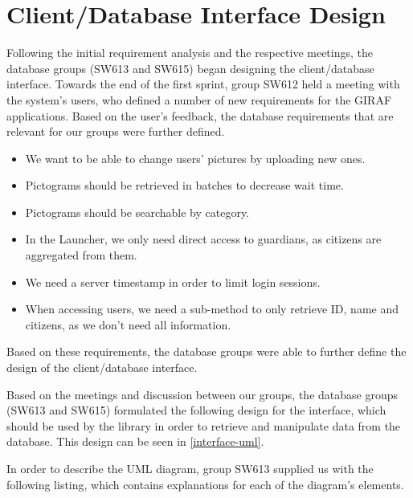 \section{Client/Database Interface Design}
Following the initial requirement analysis and the respective meetings, the
database groups (SW613 and SW615) began designing the client/database interface.
Towards the end of the first sprint, group SW612 held a meeting with the
system's users, who defined a number of new requirements for the GIRAF
applications. Based on the user's feedback, the database requirements that are
relevant for our groups were further defined.

\begin{itemize}
  \item We want to be able to change users' pictures by uploading new ones.
  \item Pictograms should be retrieved in batches to decrease wait time.
  \item Pictograms should be searchable by category.
  \item In the Launcher, we only need direct access to guardians, as citizens
  are aggregated from them.
  \item We need a server timestamp in order to limit login sessions.
  \item When accessing users, we need a sub-method to only retrieve ID, name and
  citizens, as we don't need all information.
\end{itemize}

Based on these requirements, the database groups were able to further define
the design of the client/database interface.\nl

Based on the meetings and discussion between our groups, the database groups
(SW613 and SW615) formulated the following design for the interface, which
should be used by the  library in order to retrieve and
manipulate data from the database. This design can be seen in
\autoref{interface-uml}.


In order to describe the UML diagram, group SW613 supplied us with the
following listing, which contains explanations for each of the diagram's
elements. 

